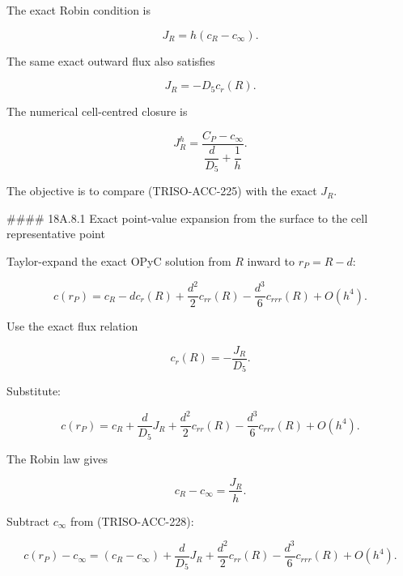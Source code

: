 \documentclass[11pt,a4paper]{article}
\begin{document}
The exact Robin condition is

\begin{equation}
J_R=h(c_R-c_\infty).
\tag{TRISO-ACC-223}
\label{eq:triso-acc-223}
\end{equation}

The same exact outward flux also satisfies

\begin{equation}
J_R=-D_5c_r(R).
\tag{TRISO-ACC-224}
\label{eq:triso-acc-224}
\end{equation}

The numerical cell-centred closure is

\begin{equation}
J_R^h
=
\frac{
C_P-c_\infty
}{
\dfrac d{D_5}+\dfrac1h
}.
\tag{TRISO-ACC-225}
\label{eq:triso-acc-225}
\end{equation}

The objective is to compare (TRISO-ACC-225) with the exact $J_R$.

\#\#\#\# 18A.8.1 Exact point-value expansion from the surface to the cell representative point

Taylor-expand the exact OPyC solution from $R$ inward to $r_P=R-d$:

\begin{equation}
c(r_P)
=
c_R
-
dc_r(R)
+
\frac{d^2}{2}c_{rr}(R)
-
\frac{d^3}{6}c_{rrr}(R)
+
O(h^4).
\tag{TRISO-ACC-226}
\label{eq:triso-acc-226}
\end{equation}

Use the exact flux relation

\begin{equation}
c_r(R)
=
-\frac{J_R}{D_5}.
\tag{TRISO-ACC-227}
\label{eq:triso-acc-227}
\end{equation}

Substitute:

\begin{equation}
c(r_P)
=
c_R
+
\frac d{D_5}J_R
+
\frac{d^2}{2}c_{rr}(R)
-
\frac{d^3}{6}c_{rrr}(R)
+
O(h^4).
\tag{TRISO-ACC-228}
\label{eq:triso-acc-228}
\end{equation}

The Robin law gives

\begin{equation}
c_R-c_\infty
=
\frac{J_R}{h}.
\tag{TRISO-ACC-229}
\label{eq:triso-acc-229}
\end{equation}

Subtract $c_\infty$ from (TRISO-ACC-228):

\begin{equation}
c(r_P)-c_\infty
=
(c_R-c_\infty)
+
\frac d{D_5}J_R
+
\frac{d^2}{2}c_{rr}(R)
-
\frac{d^3}{6}c_{rrr}(R)
+
O(h^4).
\tag{TRISO-ACC-230}
\label{eq:triso-acc-230}
\end{equation}
\end{document}
